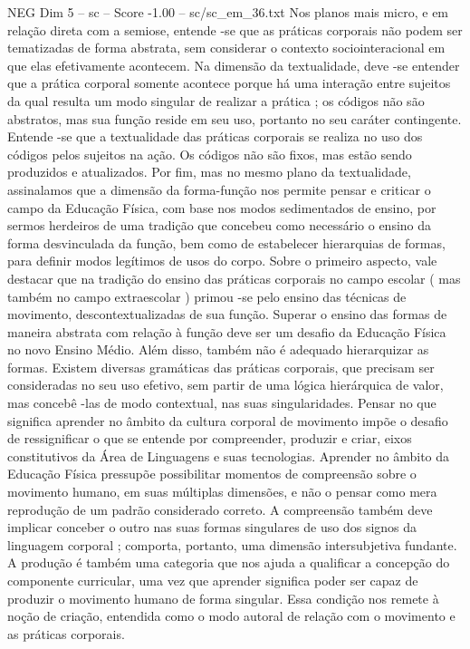 \begin{textsample}{NEG Dim 5 – sc – Score -1.00 – sc/sc\_em\_36.txt}
Nos planos mais micro, e em relação direta com a semiose, entende -se que as práticas corporais não podem ser tematizadas de forma abstrata, sem considerar o contexto sociointeracional em que elas efetivamente acontecem.
Na dimensão da textualidade, deve -se entender que a prática corporal somente acontece porque há uma interação entre sujeitos da qual resulta um modo singular de realizar a prática ; os códigos não são abstratos, mas sua função reside em seu uso, portanto no seu caráter contingente.
Entende -se que a textualidade das práticas corporais se realiza no uso dos códigos pelos sujeitos na ação.
Os códigos não são fixos, mas estão sendo produzidos e atualizados.
Por fim, mas no mesmo plano da textualidade, assinalamos que a dimensão da forma-função nos permite pensar e criticar o campo da Educação Física, com base nos modos sedimentados de ensino, por sermos herdeiros de uma tradição que concebeu como necessário o ensino da forma desvinculada da função, bem como de estabelecer hierarquias de formas, para definir modos legítimos de usos do corpo.
Sobre o primeiro aspecto, vale destacar que na tradição do ensino das práticas corporais no campo escolar ( mas também no campo extraescolar ) primou -se pelo ensino das técnicas de movimento, descontextualizadas de sua função.
Superar o ensino das formas de maneira abstrata com relação à função deve ser um desafio da Educação Física no novo Ensino Médio.
Além disso, também não é adequado hierarquizar as formas.
Existem diversas gramáticas das práticas corporais, que precisam ser consideradas no seu uso efetivo, sem partir de uma lógica hierárquica de valor, mas concebê -las de modo contextual, nas suas singularidades.
Pensar no que significa aprender no âmbito da cultura corporal de movimento impõe o desafio de ressignificar o que se entende por compreender, produzir e criar, eixos constitutivos da Área de Linguagens e suas tecnologias.
Aprender no âmbito da Educação Física pressupõe possibilitar momentos de compreensão sobre o movimento humano, em suas múltiplas dimensões, e não o pensar como mera reprodução de um padrão considerado correto.
A compreensão também deve implicar conceber o outro nas suas formas singulares de uso dos signos da linguagem corporal ; comporta, portanto, uma dimensão intersubjetiva fundante.
A produção é também uma categoria que nos ajuda a qualificar a concepção do componente curricular, uma vez que aprender significa poder ser capaz de produzir o movimento humano de forma singular.
Essa condição nos remete à noção de criação, entendida como o modo autoral de relação com o movimento e as práticas corporais.

\end{textsample}
